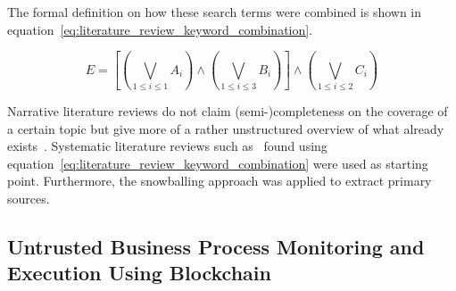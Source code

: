 The formal definition on how these search terms were combined is shown in equation~\ref{eq:literature_review_keyword_combination}.

\begin{equation}
E = [(\bigvee_{1 \leq i \leq 1} A_{i}) \wedge (\bigvee_{1 \leq i \leq 3} B_{i})] \wedge (\bigvee_{1 \leq i \leq 2} C_{i})
\label{eq:literature_review_keyword_combination}
\end{equation}

Narrative literature reviews do not claim (semi-)completeness on the coverage of a certain topic but give more of a rather unstructured overview of what already exists~\cite{literature_review_rhoades}. Systematic literature reviews such as~\cite{slr_collaborative_bpm_using_blockchain} found using equation~\ref{eq:literature_review_keyword_combination} were used as starting point. Furthermore, the snowballing approach was applied to extract primary sources. %


\subsection{Untrusted Business Process Monitoring and Execution Using Blockchain~\cite{untrusted_bp_execution_using_blockchain}}

